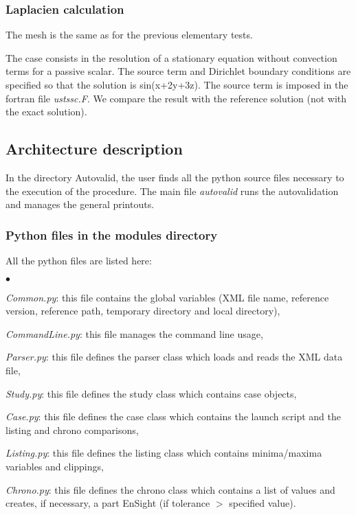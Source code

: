 \subsubsection{Laplacien calculation} 

The mesh is the same as for the previous elementary tests.

The case consists in the resolution of a stationary equation without 
convection terms for a passive scalar. The source term and Dirichlet
boundary conditions are specified so that the solution is sin(x+2y+3z).
The source term is imposed in the fortran file {\it ustssc.F}.
We compare the result with the reference solution (not with the exact
solution).



\subsection{Architecture description} 

In the directory Autovalid, the user finds all the python source 
files necessary to the execution of the procedure. The main file
{\it autovalid} runs the autovalidation and manages the general 
printouts.


\subsubsection{Python files in the modules directory} 

All the python files are listed here:

\begin{list}{$\bullet$}{}
\item {\it Common.py}: this file contains the global variables (XML
      file name, reference version, reference path, temporary directory 
      and local directory),
\item {\it CommandLine.py}: this file manages the command line usage,
\item {\it Parser.py}: this file defines the parser class which loads 
      and reads the XML data file,
\item {\it Study.py}: this file defines the study class which contains
      case objects,
\item {\it Case.py}: this file defines the case class which contains
      the launch script and the listing and chrono comparisons, 
\item {\it Listing.py}: this file defines the listing class which
      contains minima/maxima variables and clippings,
\item {\it Chrono.py}: this file defines the chrono class which 
      contains a list of values and creates, if necessary, a part
      EnSight (if tolerance $>$ specified value).   
\end{list}


